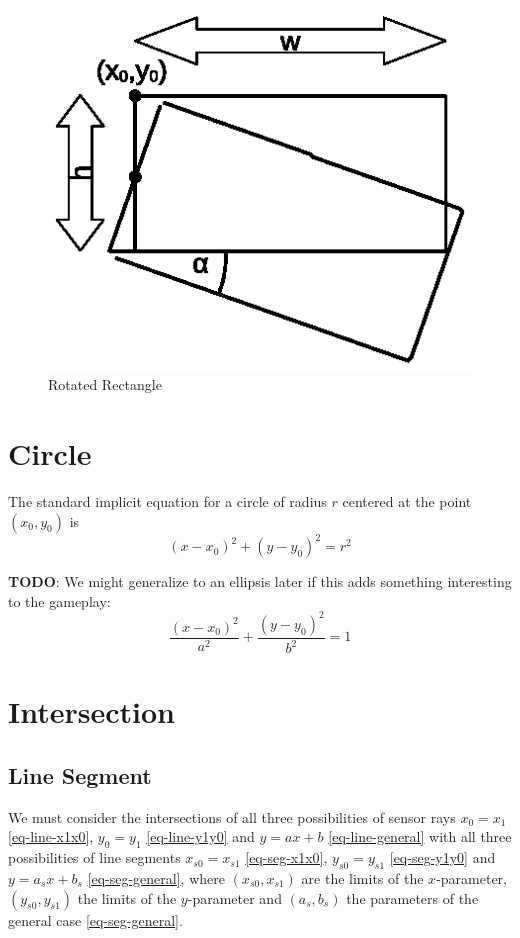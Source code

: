 \documentclass[11pt]{article}
\newcommand{\TODO}{{\bf TODO}}
\begin{document}
\begin{figure}
    \centering
    \includegraphics[trim=10 40 10 20]{rectangle.eps}
    \caption{Rotated Rectangle}\label{fig-rectangle}
\end{figure}

\section{Circle}
\label{sec-circle}

The standard implicit equation for a circle of radius $r$  centered at the 
point $(x_0, y_0)$ is
\begin{equation}
    (x - x_0)^2 + (y - y_0)^2 = r^2\label{eq-circle}
\end{equation}

\TODO: We might generalize to an ellipsis later if this adds something
interesting to the gameplay:
\begin{equation}
    \frac{(x-x_0)^2}{a^2} + \frac{(y-y_0)^2}{b^2} = 1
\end{equation}

\section{Intersection}
\label{sec-intersection}

\subsection{Line Segment}
\label{sec-intersection-line-segment}
We must consider the intersections of all three possibilities of sensor rays 
$x_0=x_1$ \eqref{eq-line-x1x0}, $y_0=y_1$ \eqref{eq-line-y1y0} and $y=ax+b$ 
\eqref{eq-line-general} with all three possibilities of line segments  
$x_{s0}=x_{s1}$ \eqref{eq-seg-x1x0}, $y_{s0}=y_{s1}$ \eqref{eq-seg-y1y0} and
$y=a_{s}x+b_{s}$ \eqref{eq-seg-general}, where $(x_{s0}, x_{s1})$ are the 
limits of the $x$-parameter, $(y_{s0}, y_{s1})$ the limits of the 
$y$-parameter and $(a_{s}, b_{s})$ the parameters of the general case 
\eqref{eq-seg-general}.
\end{document}
